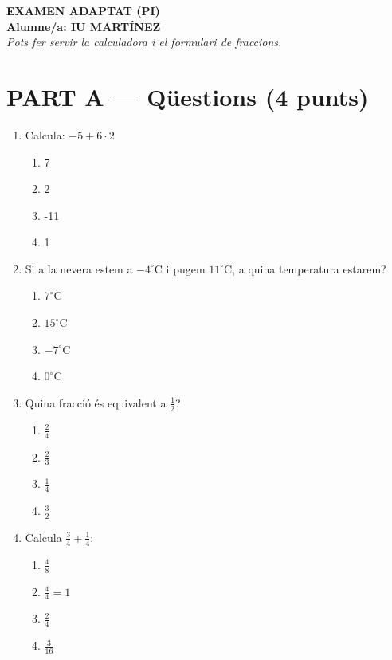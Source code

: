 \documentclass[a4paper, 11pt]{article}
\begin{document}
\begin{center}
    {\huge \textbf{EXAMEN ADAPTAT (PI)}} \\
    \vspace{0.5cm}
    \textbf{Alumne/a: IU MARTÍNEZ} \\
    \vspace{0.3cm}
    \textit{Pots fer servir la calculadora i el formulari de fraccions.}
\end{center}

\vspace{1cm}

\section*{PART A — Qüestions (4 punts)}

\begin{enumerate}
    \item Calcula: $-5 + 6 \cdot 2$
    \begin{enumerate}[label=\Alph*)] \item 7 \item 2 \item -11 \item 1 \end{enumerate}

    \item Si a la nevera estem a $-4^\circ\text{C}$ i pugem $11^\circ\text{C}$, a quina temperatura estarem?
    \begin{enumerate}[label=\Alph*)] \item $7^\circ\text{C}$ \item $15^\circ\text{C}$ \item $-7^\circ\text{C}$ \item $0^\circ\text{C}$ \end{enumerate}

    \item Quina fracció és equivalent a $\frac{1}{2}$?
    \begin{enumerate}[label=\Alph*)] \item $\frac{2}{4}$ \item $\frac{2}{3}$ \item $\frac{1}{4}$ \item $\frac{3}{2}$ \end{enumerate}

    \item Calcula $\frac{3}{4} + \frac{1}{4}$:
    \begin{enumerate}[label=\Alph*)] \item $\frac{4}{8}$ \item $\frac{4}{4} = 1$ \item $\frac{2}{4}$ \item $\frac{3}{16}$ \end{enumerate}
\end{enumerate}
\end{document}
